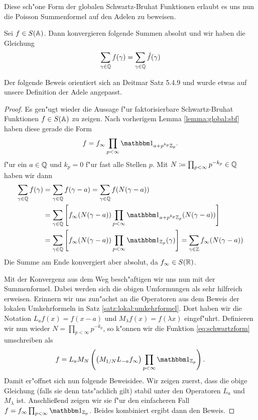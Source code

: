 	Diese sch"one Form der globalen Schwartz-Bruhat Funktionen erlaubt es uns nun die Poisson Summenformel auf den Adelen zu beweisen.
	\begin{satz}
	\label{satz:tateproof:poisson}
		Sei $f \in S(\mathbb{A})$. Dann konvergieren folgende Summen absolut und wir haben die Gleichung
		\begin{align}
			\sum_{\gamma \in \mathbb{Q}} {f(\gamma)} = \sum_{\gamma \in \mathbb{Q}}{\hat{f}(\gamma)}
		\end{align}
	\end{satz}
	Der folgende Beweis orientiert sich an Deitmar \cite{deitmar2010} Satz 5.4.9 und wurde etwas auf unsere Definition der Adele angepasst.
	\begin{proof}
		Es gen"ugt wieder die Aussage f"ur faktorisierbare Schwartz-Bruhat Funktionen $f \in S(\mathbb{A})$ zu zeigen.
		Nach vorherigem Lemma \ref{lemma:global:sbf} haben diese gerade die Form
		\begin{align}
		\label{eq:schwartzform}
			f = f_\infty\prod_{p<\infty} \ind_{a+p^{k_p}\Zp}.
		\end{align}
		f"ur ein $a \in \mathbb{Q}$ und $k_p = 0$ f"ur fast alle Stellen $p$.
		Mit $N\coloneqq \prod_{p<\infty} p^{-k_p} \in \mathbb{Q}$ haben wir dann
		\begin{align*}
			\sum_{\gamma \in \K} {f(\gamma)} 	&= 	\sum_{\gamma \in \K} f(\gamma - a)
												= 	\sum_{\gamma \in \K} f(N(\gamma - a)) \\
												&= 	\sum_{\gamma \in \K} \left[ f_\infty (N(\gamma - a))  \prod_{p< \infty} \ind_{a+p^{k_p}\Zp}(N(\gamma - a)) \right] \\
												&= 	\sum_{\gamma \in \K} \left[ f_\infty (N(\gamma - a))  \prod_{p< \infty} \ind_{\Zp}(\gamma) \right]
												=	\sum_{\gamma \in \Z} f_\infty (N(\gamma - a))
		\end{align*}
		Die Summe am Ende konvergiert aber absolut, da $f_\infty \in S(\mathbb{R})$.
		
		Mit der Konvergenz aus dem Weg besch"aftigen wir uns nun mit der Summenformel.
		Dabei werden sich die obigen Umformungen als sehr hilfreich erweisen.
		Erinnern wir uns zun"achst an die Operatoren aus dem Beweis der lokalen Umkehrformeln in Satz \ref{satz:lokal:umkehrformel}.
		Dort haben wir die Notation $L_a f(x) = f(x-a)$ und $M_\lambda f(x) = f(\lambda x)$ eingef"uhrt.
		Definieren wir nun wieder $N= \prod_{p<\infty} p^{-k_p}$, so k"onnen wir die Funktion \ref{eq:schwartzform} umschreiben als
		\begin{align*}
			f = L_a M_{N}\left( \left(M_{1/N} L_{-a} f_\infty\right) \prod_{p<\infty}\ind_{\Zp}\right).
		\end{align*}
		Damit er"offnet sich nun folgende Beweisidee. 
		Wir zeigen zuerst, dass die obige Gleichung (falls sie denn tats"achlich gilt) stabil unter den Operatoren $L_a$ und $M_\lambda$ ist.
		Anschließend zeigen wir sie f"ur den einfacheren Fall $f=f_\infty \prod_{p<\infty}\ind_{\Zp}$.
		Beides kombiniert ergibt dann den Beweis.
		

\end{proof}
